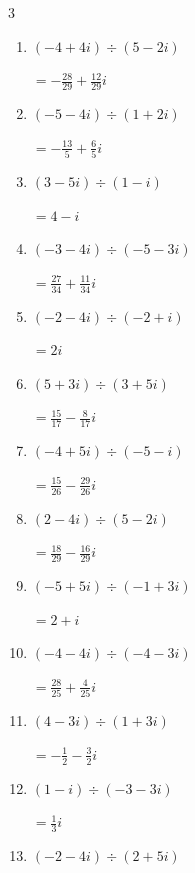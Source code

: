 \begin{multicols}{3}
\begin{enumerate}
  \item $\displaystyle (-4+4i)\div(5-2i)$

        $\displaystyle =-\frac{28}{29}+\frac{12}{29}i$

  \item $\displaystyle (-5-4i)\div(1+2i)$

        $\displaystyle =-\frac{13}{5}+\frac{6}{5}i$

  \item $\displaystyle (3-5i)\div(1-i)$

        $\displaystyle =4-i$

\columnbreak %

  \item $\displaystyle (-3-4i)\div(-5-3i)$

        $\displaystyle =\frac{27}{34}+\frac{11}{34}i$

  \item $\displaystyle (-2-4i)\div(-2+i)$

        $\displaystyle =2i$

  \item $\displaystyle (5+3i)\div(3+5i)$

        $\displaystyle =\frac{15}{17}-\frac{8}{17}i$

  \item $\displaystyle (-4+5i)\div(-5-i)$

        $\displaystyle =\frac{15}{26}-\frac{29}{26}i$

  \item $\displaystyle (2-4i)\div(5-2i)$

        $\displaystyle =\frac{18}{29}-\frac{16}{29}i$

  \item $\displaystyle (-5+5i)\div(-1+3i)$

        $\displaystyle =2+i$

  \item $\displaystyle (-4-4i)\div(-4-3i)$

        $\displaystyle =\frac{28}{25}+\frac{4}{25}i$

  \item $\displaystyle (4-3i)\div(1+3i)$

        $\displaystyle =-\frac{1}{2}-\frac{3}{2}i$

  \item $\displaystyle (1-i)\div(-3-3i)$

        $\displaystyle =\frac{1}{3}i$

  \item $\displaystyle (-2-4i)\div(2+5i)$


\end{enumerate}
\end{multicols}
